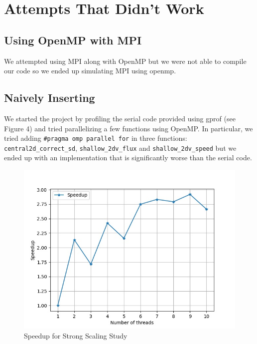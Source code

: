 \documentclass{article}
\begin{document}
\section{Attempts That Didn't Work}

\subsection{Using OpenMP with MPI}

We attempted using MPI along with OpenMP but we were not able to compile our code so we ended up simulating MPI using openmp.

\subsection{Naively Inserting }

We started the project by profiling the serial code provided using gprof (see Figure 4) and tried parallelizing a few functions using OpenMP. In particular, we tried adding \texttt{\#pragma omp parallel for} in three functions: \texttt{central2d\_correct\_sd}, \texttt{shallow\_2dv\_flux} and \texttt{shallow\_2dv\_speed} but we ended up with an implementation that is significantly worse than the serial code.

\begin{figure}[h!]
	\centering
	\includegraphics[width=0.8\columnwidth]{../strong_scaling.jpg}
	\caption{Speedup for Strong Scaling Study}
	\label{fig:strong_scaling}
\end{figure}
\end{document}
